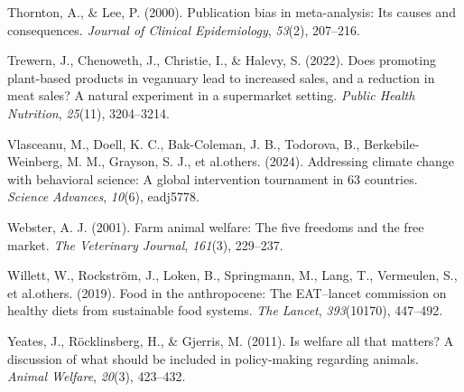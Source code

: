 \documentclass[
  man]{apa6}
\newlength{\cslhangindent}
\newenvironment{CSLReferences}[2] %
 {\begin{list}{}{%
  \setlength{\itemindent}{0pt}
  \setlength{\leftmargin}{0pt}
  \setlength{\parsep}{0pt}
  \ifodd #1
   \setlength{\leftmargin}{\cslhangindent}
   \setlength{\itemindent}{-1\cslhangindent}
  \fi
  \setlength{\itemsep}{#2\baselineskip}}}
 {\end{list}}
\begin{document}
\begin{CSLReferences}{1}{0}
Thornton, A., \& Lee, P. (2000). Publication bias in meta-analysis: Its causes and consequences. \emph{Journal of Clinical Epidemiology}, \emph{53}(2), 207--216.

Trewern, J., Chenoweth, J., Christie, I., \& Halevy, S. (2022). Does promoting plant-based products in veganuary lead to increased sales, and a reduction in meat sales? A natural experiment in a supermarket setting. \emph{Public Health Nutrition}, \emph{25}(11), 3204--3214.

Vlasceanu, M., Doell, K. C., Bak-Coleman, J. B., Todorova, B., Berkebile-Weinberg, M. M., Grayson, S. J., et al.others. (2024). Addressing climate change with behavioral science: A global intervention tournament in 63 countries. \emph{Science Advances}, \emph{10}(6), eadj5778.

Webster, A. J. (2001). Farm animal welfare: The five freedoms and the free market. \emph{The Veterinary Journal}, \emph{161}(3), 229--237.

Willett, W., Rockström, J., Loken, B., Springmann, M., Lang, T., Vermeulen, S., et al.others. (2019). Food in the anthropocene: The EAT--lancet commission on healthy diets from sustainable food systems. \emph{The Lancet}, \emph{393}(10170), 447--492.

Yeates, J., Röcklinsberg, H., \& Gjerris, M. (2011). Is welfare all that matters? A discussion of what should be included in policy-making regarding animals. \emph{Animal Welfare}, \emph{20}(3), 423--432.

\end{CSLReferences}
\end{document}
